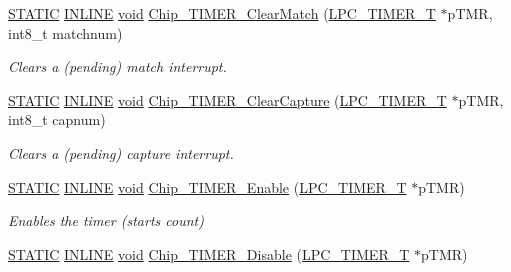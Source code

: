 \begin{DoxyCompactItemize}
\hyperlink{group__LPC__Types__Public__Macros_ga10b2d890d871e1489bb02b7e70d9bdfb}{S\-T\-A\-T\-I\-C} \hyperlink{group__LPC__Types__Public__Types_ga2eb6f9e0395b47b8d5e3eeae4fe0c116}{I\-N\-L\-I\-N\-E} \hyperlink{Paradigm_2Tern__EE_2small_2portmacro_8h_a14d32f8130d3c0b212cfc751730b5b49}{void} \hyperlink{group__TIMER__17XX__40XX_gae9ad45169f0511d27696923acfd6a17e}{Chip\-\_\-\-T\-I\-M\-E\-R\-\_\-\-Clear\-Match} (\hyperlink{structLPC__TIMER__T}{L\-P\-C\-\_\-\-T\-I\-M\-E\-R\-\_\-\-T} $\ast$p\-T\-M\-R, int8\-\_\-t matchnum)
\begin{DoxyCompactList}\small\item\em Clears a (pending) match interrupt. \end{DoxyCompactList}\item 
\hyperlink{group__LPC__Types__Public__Macros_ga10b2d890d871e1489bb02b7e70d9bdfb}{S\-T\-A\-T\-I\-C} \hyperlink{group__LPC__Types__Public__Types_ga2eb6f9e0395b47b8d5e3eeae4fe0c116}{I\-N\-L\-I\-N\-E} \hyperlink{Paradigm_2Tern__EE_2small_2portmacro_8h_a14d32f8130d3c0b212cfc751730b5b49}{void} \hyperlink{group__TIMER__17XX__40XX_ga0aebc9314c86b4e9a67e2d08bab38e24}{Chip\-\_\-\-T\-I\-M\-E\-R\-\_\-\-Clear\-Capture} (\hyperlink{structLPC__TIMER__T}{L\-P\-C\-\_\-\-T\-I\-M\-E\-R\-\_\-\-T} $\ast$p\-T\-M\-R, int8\-\_\-t capnum)
\begin{DoxyCompactList}\small\item\em Clears a (pending) capture interrupt. \end{DoxyCompactList}\item 
\hyperlink{group__LPC__Types__Public__Macros_ga10b2d890d871e1489bb02b7e70d9bdfb}{S\-T\-A\-T\-I\-C} \hyperlink{group__LPC__Types__Public__Types_ga2eb6f9e0395b47b8d5e3eeae4fe0c116}{I\-N\-L\-I\-N\-E} \hyperlink{Paradigm_2Tern__EE_2small_2portmacro_8h_a14d32f8130d3c0b212cfc751730b5b49}{void} \hyperlink{group__TIMER__17XX__40XX_gaff500707a8a397daf29cc84f454802b2}{Chip\-\_\-\-T\-I\-M\-E\-R\-\_\-\-Enable} (\hyperlink{structLPC__TIMER__T}{L\-P\-C\-\_\-\-T\-I\-M\-E\-R\-\_\-\-T} $\ast$p\-T\-M\-R)
\begin{DoxyCompactList}\small\item\em Enables the timer (starts count) \end{DoxyCompactList}\item 
\hyperlink{group__LPC__Types__Public__Macros_ga10b2d890d871e1489bb02b7e70d9bdfb}{S\-T\-A\-T\-I\-C} \hyperlink{group__LPC__Types__Public__Types_ga2eb6f9e0395b47b8d5e3eeae4fe0c116}{I\-N\-L\-I\-N\-E} \hyperlink{Paradigm_2Tern__EE_2small_2portmacro_8h_a14d32f8130d3c0b212cfc751730b5b49}{void} \hyperlink{group__TIMER__17XX__40XX_gae7fedfd4c2543991eddd7be1b32bd00b}{Chip\-\_\-\-T\-I\-M\-E\-R\-\_\-\-Disable} (\hyperlink{structLPC__TIMER__T}{L\-P\-C\-\_\-\-T\-I\-M\-E\-R\-\_\-\-T} $\ast$p\-T\-M\-R)

\end{DoxyCompactItemize}
